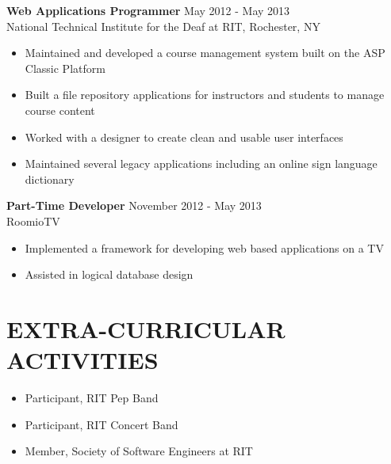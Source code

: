 \documentclass[line,margin]{res}
\begin{document}
\begin{resume}
			   {\bf Web Applications Programmer} \hfill May 2012 - May 2013\\
               National Technical Institute for the Deaf at RIT, 
               Rochester, NY
               
                 \begin{itemize}  \itemsep -2pt %
				  \item Maintained and developed a course management system built on the ASP Classic Platform
                  \item Built a file repository applications for instructors and students to manage course content
                  \item Worked with a designer to create clean and usable user interfaces
                  \item Maintained several legacy applications including an online sign language dictionary
                \end{itemize}
 

   
                {\bf Part-Time Developer} \hfill            November 2012 - May 2013\\
                  RoomioTV
                  \begin{itemize}  \itemsep -2pt %
                     \item Implemented a framework for developing web based applications on a TV
                     \item Assisted in logical database design
                 \end{itemize} 
 
				 \section{EXTRA-CURRICULAR \\ ACTIVITIES}             
				     \begin{itemize}  \itemsep -2pt 
						\item Participant, RIT Pep Band
				     	\item Participant, RIT Concert Band 
					 	\item Member, Society of Software Engineers at RIT
				 	\end{itemize} 
\end{resume}
\end{document}
